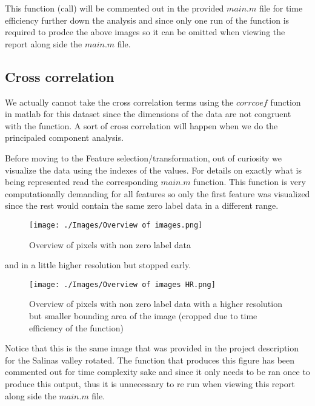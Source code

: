 \documentclass[12pt, a4paper]{article}
\begin{document}
This function (call) will be commented out in the provided $main.m$ file for time efficiency further down the analysis and since only one run of the function is required to prodce the above images so it can be omitted when viewing the report along side the $main.m$ file.
\newline

\subsection{Cross correlation} \label{cross}

We actually cannot take the cross correlation terms using the $corrcoef$ function in matlab for this dataset since the dimensions of the data are not congruent with the function. A sort of cross correlation will happen when we do the principaled component analysis.
\newline

Before moving to the Feature selection/transformation, out of curiosity we visualize the data using the indexes of the values. For details on exactly what is being represented read the corresponding $main.m$ function. This function is very computationally demanding for all features so only the first feature was visualized since the rest would contain the same zero label data in a different range.
\newline

\begin{figure}[H]
    \begin{center}
        \texttt{[image: ./Images/Overview of images.png]}
    \end{center}
    \caption{Overview of pixels with non zero label data}\label{fig:overview}
\end{figure}

and in a little higher resolution but stopped early.
\newline

\begin{figure}[H]
    \begin{center}
        \texttt{[image: ./Images/Overview of images HR.png]}
    \end{center}
    \caption{Overview of pixels with non zero label data with a higher resolution but smaller bounding area of the image (cropped due to time efficiency of the function)}\label{fig:overview hd}
\end{figure}

Notice that this is the same image that was provided in the project description for the Salinas valley rotated. The function that produces this figure has been commented out for time complexity sake and since it only needs to be ran once to produce this output, thus it is unnecessary to re run when viewing this report along side the $main.m$ file.
\end{document}
